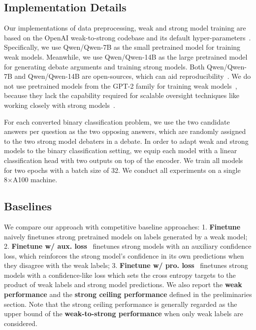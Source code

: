 \documentclass[letterpaper]{article} %
\begin{document}
\subsection{Implementation Details}

Our implementations of data preprocessing, weak and strong model training are based on the OpenAI weak-to-strong codebase and its default hyper-parameters~\cite{burns2023weak}.
Specifically, we use Qwen/Qwen-7B as the small pretrained model for training weak models.
Meanwhile, we use Qwen/Qwen-14B as the large pretrained model for generating debate arguments and training strong models.
Both Qwen/Qwen-7B and Qwen/Qwen-14B are open-sources, which can aid reproducibility~\cite{bai2023qwen}.
We do not use pretrained models from the GPT-2 family for training weak models~\cite{radford2019language}, because they lack the capability required for scalable oversight techniques like working closely with strong models~\cite{bowman2022measuring}.

For each converted binary classification problem, we use the two candidate answers per question as the two opposing answers, which are randomly assigned to the two strong model debaters in a debate.
In order to adapt weak and strong models to the binary classification setting, we equip each model with a linear classification head with two outputs on top of the encoder.
We train all models for two epochs with a batch size of 32.
We conduct all experiments on a single 8×A100 machine.

\subsection{Baselines}

We compare our approach with competitive baseline approaches:
1. \textbf{Finetune}~\cite{burns2023weak} naively finetunes strong pretrained models on labels generated by a weak model;
2. \textbf{Finetune w/ aux. loss}~\cite{burns2023weak} finetunes strong models with an auxiliary confidence loss, which reinforces the strong model’s confidence in its own predictions when they disagree with the weak labels;
3. \textbf{Finetune w/ pro. loss}~\cite{burns2023weak} finetunes strong models with a confidence-like loss which sets the cross entropy targets to the product of weak labels and strong model predictions.
We also report the \textbf{weak performance} and the \textbf{strong ceiling performance} defined in the preliminaries section.
Note that the strong ceiling performance is generally regarded as the upper bound of the \textbf{weak-to-strong performance} when only weak labels are considered.
\end{document}
